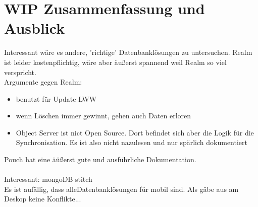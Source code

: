 \chapter{\label{chap:fazit}WIP Zusammenfassung und Ausblick}
Interessant wäre es andere, 'richtige' Datenbanklösungen zu untersuchen. 
Realm ist leider kostenpflichtig, wäre aber äußerst spannend weil Realm so viel verspricht.\\
Argumente gegen Realm:
\begin{itemize}
  \item benutzt für Update LWW
  \item wenn Löschen immer gewinnt, gehen auch Daten erloren
  \item Object Server ist nict Open Source. Dort befindet sich aber die Logik für die Synchronisation. Es ist also nicht nazulesen und nur spärlich dokumentiert
\end{itemize}
Pouch hat eine äüßerst gute und ausführliche Dokumentation.\\\\
Interessant: mongoDB stitch \\
Es ist aufällig, dass alleDatenbanklösungen für mobil sind. Als gäbe aus am Deskop keine Konflikte...